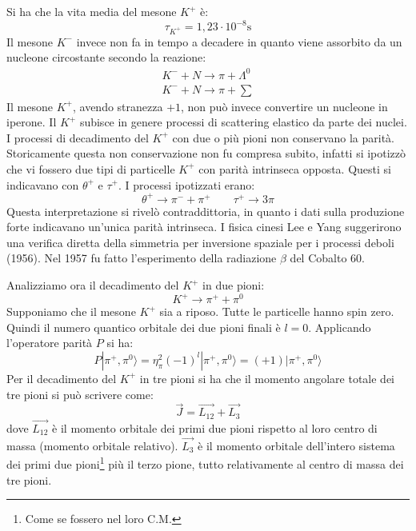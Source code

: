 Si ha che la vita media del mesone $K^+$ è:
\[
\tau_{K^+}=1,23\cdot 10^{-8}\si{\second}
\]
Il mesone $K^-$ invece non fa in tempo a decadere in quanto viene assorbito da 
un nucleone circostante secondo la reazione:
\begin{gather}
K^-+N\rightarrow \pi+\Lambda^0\\
K^-+N\rightarrow \pi+\sum
\end{gather}
Il mesone $K^+$, avendo stranezza $+1$, non può invece convertire un nucleone 
in iperone.
Il $K^+$ subisce in genere processi di scattering elastico da parte dei nuclei.
I processi di decadimento del $K^+$ con due o più pioni non conservano la 
parità.
Storicamente questa non conservazione non fu compresa subito, infatti si 
ipotizzò che vi fossero due tipi
di particelle $K^+$ con parità intrinseca opposta.
Questi si indicavano con $\theta^+$ e $\tau^+$. I processi ipotizzati erano:
\[
\theta^+\rightarrow \pi^-+\pi^+\qquad \tau^+\rightarrow 3\pi
\]
Questa interpretazione si rivelò contraddittoria, in quanto i dati sulla 
produzione forte indicavano un'unica
parità intrinseca. I fisica cinesi Lee e Yang suggerirono una verifica diretta 
della simmetria per inversione
spaziale per i processi deboli (1956).
Nel 1957 fu fatto l'esperimento della radiazione $\beta$ del Cobalto 60.

Analizziamo ora il decadimento del $K^+$ in due pioni:
\[
K^+\rightarrow \pi^++\pi^0
\]
Supponiamo che il mesone $K^+$ sia a riposo. Tutte le particelle hanno spin 
zero.
Quindi il numero quantico orbitale dei due pioni finali è $l=0$. Applicando 
l'operatore parità $P$ si ha:
\begin{equation}
P|\pi^+,\pi^0\rangle=\eta_{\pi}^2(-1)^l|\pi^+,\pi^0\rangle=(+1)|\pi^+,\pi^0
\rangle
\end{equation}
Per il decadimento del $K^+$ in tre pioni si ha che il momento angolare totale 
dei tre pioni si può scrivere come:
\begin{equation}
\vec{J}=\vec{L_{12}}+\vec{L_3}
\end{equation}
dove $\vec{L_{12}}$ è il momento orbitale dei primi due pioni rispetto al loro 
centro di massa (momento orbitale relativo).
$\vec{L_3}$ è il momento orbitale dell'intero sistema dei primi due 
pioni\footnote{Come se fossero nel loro C.M.}
più il terzo pione, tutto relativamente al centro di massa dei tre pioni.

